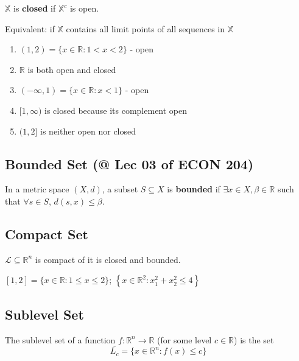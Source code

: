 \documentclass[11pt]{elegantbook}
\begin{document}
\begin{definition}
    $\mathbb{X}$ is \textbf{closed} if $\mathbb{X}^c$ is open.

    Equivalent: if $\mathbb{X}$ contains all limit points of all sequences in $\mathbb{X}$
\end{definition}
\begin{example}
\end{example}
\begin{enumerate}[1)]
    \item $(1,2)=\{x \in \mathbb{R}: 1<x<2\}$ - open
    \item $\mathbb{R}$ is both open and closed
    \item $(-\infty, 1)=\{x \in \mathbb{R}: x<1\}$ - open
    \item $[1, \infty)$ is closed because its complement open
    \item $(1,2]$ is neither open nor closed
\end{enumerate}

\subsection{Bounded Set \small{(@ Lec 03 of ECON 204)}}
\begin{definition}
    \normalfont
    In a metric space $(X, d)$, a subset $S \subseteq X$ is \textbf{bounded} if $\exists x \in X, \beta \in \mathbb{R}$ such that $\forall s \in S$, $d(s, x) \leq \beta$.
\end{definition}

\subsection{Compact Set}
\begin{definition}
    \normalfont
    $\mathcal{L} \subseteq \mathbb{R}^{n}$ is compact of it is closed and bounded.
\end{definition}

\begin{example}
    \normalfont
    $[1,2]=\{x \in \mathbb{R}: 1 \leqslant x \leqslant 2\}$; $\left\{x \in \mathbb{R}^{2}\right.: \left.x_{1}^{2}+x_{2}^{2} \leqslant 4\right\}$
\end{example}

\subsection{Sublevel Set}
\begin{definition}
    \normalfont
    The sublevel set of a function $f: \mathbb{R}^n \rightarrow \mathbb{R}$ (for some level $c\in \mathbb{R}$) is the set $$\overline{L_c}=\{x\in \mathbb{R}^n:f(x)\leq c\}$$
\end{definition}
\end{document}
